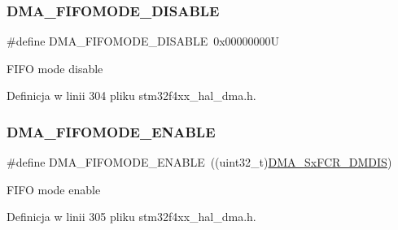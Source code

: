 \subsubsection{\texorpdfstring{D\+M\+A\+\_\+\+F\+I\+F\+O\+M\+O\+D\+E\+\_\+\+D\+I\+S\+A\+B\+LE}{DMA\_FIFOMODE\_DISABLE}}
{\footnotesize\ttfamily \#define D\+M\+A\+\_\+\+F\+I\+F\+O\+M\+O\+D\+E\+\_\+\+D\+I\+S\+A\+B\+LE~0x00000000U}

F\+I\+FO mode disable 

Definicja w linii 304 pliku stm32f4xx\+\_\+hal\+\_\+dma.\+h.

\mbox{\label{group___d_m_a___f_i_f_o__direct__mode_ga18709570bed6b9112520701c482fbe4b}} 
\subsubsection{\texorpdfstring{D\+M\+A\+\_\+\+F\+I\+F\+O\+M\+O\+D\+E\+\_\+\+E\+N\+A\+B\+LE}{DMA\_FIFOMODE\_ENABLE}}
{\footnotesize\ttfamily \#define D\+M\+A\+\_\+\+F\+I\+F\+O\+M\+O\+D\+E\+\_\+\+E\+N\+A\+B\+LE~((uint32\+\_\+t)\hyperlink{group___peripheral___registers___bits___definition_ga89406bb954742665691c0ac2f8d95ec9}{D\+M\+A\+\_\+\+Sx\+F\+C\+R\+\_\+\+D\+M\+D\+IS})}

F\+I\+FO mode enable 

Definicja w linii 305 pliku stm32f4xx\+\_\+hal\+\_\+dma.\+h.

